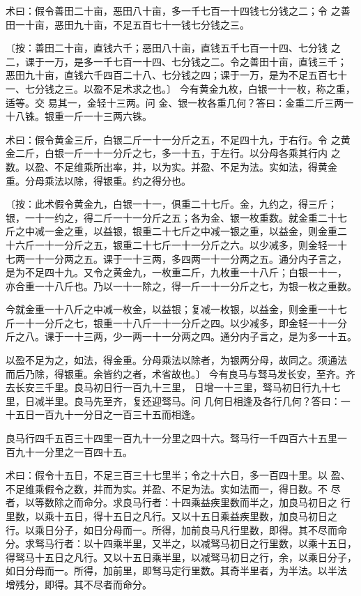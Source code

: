 \documentclass[a4paper,12pt,UTF8,twoside]{ctexbook}
\begin{document}
术曰：假令善田二十亩，恶田八十亩，多一千七百一十四钱七分钱之二；令 之善田一十亩，恶田九十亩，不足五百七十一钱七分钱之三。

〔按：善田二十亩，直钱六千；恶田八十亩，直钱五千七百一十四、七分钱 之二，课于一万，是多一千七百一十四、七分钱之二。令之善田十亩，直钱三千； 恶田九十亩，直钱六千四百二十八、七分钱之四；课于一万，是为不足五百七十 一、七分钱之三。以盈不足术求之也。〕 今有黄金九枚，白银一十一枚，称之重，适等。交 易其一，金轻十三两。问 金、银一枚各重几何？答曰：金重二斤三两一十八铢。银重一斤一十三两六铢。

术曰：假令黄金三斤，白银二斤一十一分斤之五，不足四十九，于右行。令 之黄金二斤，白银一斤一十一分斤之七，多一十五，于左行。以分母各乘其行内 之数。以盈、不足维乘所出率，并，以为实。并盈、不足为法。实如法，得黄金 重。分母乘法以除，得银重。约之得分也。

〔按：此术假令黄金九，白银一十一，俱重二十七斤。金，九约之，得三斤； 银，一十一约之，得二斤一十一分斤之五；各为金、银一枚重数。就金重二十七 斤之中减一金之重，以益银，银重二十七斤之中减一银之重，以益金，则金重二 十六斤一十一分斤之五，银重二十七斤一十一分斤之六。以少减多，则金轻一十 七两一十一分两之五。课于一十三两，多四两一十一分两之五。通分内子言之， 是为不足四十九。又令之黄金九，一枚重二斤，九枚重一十八斤；白银一十一， 亦合重一十八斤也。乃以一十一除之，得一斤一十一分斤之七，为银一枚之重数。

今就金重一十八斤之中减一枚金，以益银；复减一枚银，以益金，则金重一十七 斤一十一分斤之七，银重一十八斤一十一分斤之四。以少减多，即金轻一十一分 斤之八。课于一十三两，少一两一十一分两之四。通分内子言之，是为多一十五。

以盈不足为之，如法，得金重。分母乘法以除者，为银两分母，故同之。须通法 而后乃除，得银重。余皆约之者，术省故也。〕 今有良马与驽马发长安，至齐。齐去长安三千里。良马初日行一百九十三里， 日增一十三里，驽马初日行九十七里，日减半里。良马先至齐，复还迎驽马。问 几何日相逢及各行几何？答曰：一十五日一百九十一分日之一百三十五而相逢。

良马行四千五百三十四里一百九十一分里之四十六。驽马行一千四百六十五里一 百九十一分里之一百四十五。

术曰：假令十五日，不足三百三十七里半；令之十六日，多一百四十里。以 盈、不足维乘假令之数，并而为实。并盈、不足为法。实如法而一，得日数。不 尽者，以等数除之而命分。求良马行者：十四乘益疾里数而半之，加良马初日之 行里数，以乘十五日，得十五日之凡行。又以十五日乘益疾里数，加良马初日之 行。以乘日分子，如日分母而一。所得，加前良马凡行里数，即得。其不尽而命 分。求驽马行者：以十四乘半里，又半之，以减驽马初日之行里数，以乘十五日， 得驽马十五日之凡行。又以十五日乘半里，以减驽马初日之行，余，以乘日分子， 如日分母而一。所得，加前里，即驽马定行里数。其奇半里者，为半法。以半法 增残分，即得。其不尽者而命分。
\end{document}
